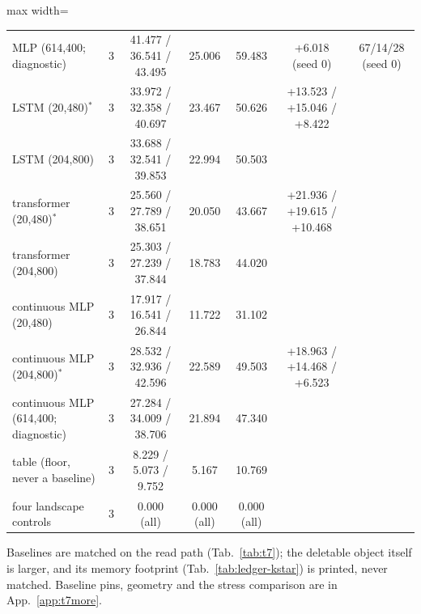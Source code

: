 \documentclass{article} %
\begin{document}
\begin{table}[t]
\begin{adjustbox}{max width=\linewidth}
\begin{tabular}{lcccccc}
MLP (614,400; diagnostic) & 3 & 41.477 / 36.541 / 43.495 & 25.006 & 59.483 & +6.018 (seed 0) & 67/14/28 (seed 0) \\
LSTM (20,480)$^\ast$ & 3 & 33.972 / 32.358 / 40.697 & 23.467 & 50.626 & +13.523 / +15.046 / +8.422 & \\
LSTM (204,800) & 3 & 33.688 / 32.541 / 39.853 & 22.994 & 50.503 & & \\
transformer (20,480)$^\ast$ & 3 & 25.560 / 27.789 / 38.651 & 20.050 & 43.667 & +21.936 / +19.615 / +10.468 & \\
transformer (204,800) & 3 & 25.303 / 27.239 / 37.844 & 18.783 & 44.020 & & \\
continuous MLP (20,480) & 3 & 17.917 / 16.541 / 26.844 & 11.722 & 31.102 & & \\
continuous MLP (204,800)$^\ast$ & 3 & 28.532 / 32.936 / 42.596 & 22.589 & 49.503 & +18.963 / +14.468 / +6.523 & \\
continuous MLP (614,400; diagnostic) & 3 & 27.284 / 34.009 / 38.706 & 21.894 & 47.340 & & \\
table (floor, never a baseline) & 3 & 8.229 / 5.073 / 9.752 & 5.167 & 10.769 & & \\
\midrule
four landscape controls & 3 & 0.000 (all) & 0.000 (all) & 0.000 (all) & & \\
\bottomrule
\end{tabular}\end{adjustbox}
\end{table}

\noindent Baselines are matched on the read path (Tab.~\ref{tab:t7}); the deletable object
itself is larger, and its memory footprint (Tab.~\ref{tab:ledger-kstar}) is printed, never
matched. Baseline pins, geometry and the stress comparison are in App.~\ref{app:t7more}.

\end{document}
